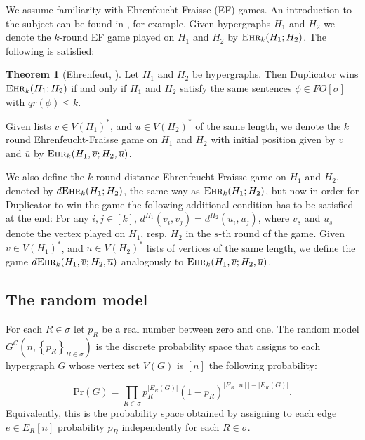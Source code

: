 \documentclass[12pt,notitlepage,a4paper]{article}
\theoremstyle{definition}
\newtheorem{theorem}{Theorem}[section]
\newcommand{\ehr}{\textsc{Ehr}}
\newcommand{\InR}[1]{\left\{ #1_R \right\}_{R\in \sigma}}
\begin{document}
We assume familiarity with Ehrenfeucht-Fraisse (EF) games.
An introduction to the subject can be found in
\cite[Section 2]{finitemodeltheory1}, for example. Given
hypergraphs $H_1$ and $H_2$ we denote the $k$-round EF game played 
on $H_1$ and
$H_2$ by $\ehr_k(H_1;H_2)$.
The following is satisfied:

\begin{theorem}
	[Ehrenfeut, \citealp{ehrenfeucht1961application}] Let
	$H_1$ and $H_2$ be hypergraphs.
	Then Duplicator wins $\ehr_k(H_1;H_2)$
	if and only if $H_1$ and $H_2$ satisfy the same 
	sentences $\phi\in FO[\sigma]$ with $qr(\phi)\leq k$.		
\end{theorem}

Given lists $\overline{v}\in V(H_1)^*$, and 
$\overline{u}\in V(H_2)^*$ of the same length, 
we denote the $k$ round 
Ehrenfeucht-Fraisse game on $H_1$ and $H_2$ with initial position given
by $\overline{v}$ and $\overline{u}$ by $\ehr_k(H_1,\overline{v};H_2,\overline{u})$.\par

We also define the $k$-round distance Ehrenfeucht-Fraisse game on 
$H_1$ and $H_2$, denoted by $d\ehr_k(H_1;H_2)$, the same way as
$\ehr_k(H_1;H_2)$, but now in order for Duplicator to win the
game the following additional condition has to be satisfied 
at the end: For any $i,j\in [k]$, $d^{H_1}(v_i,v_j)=d^{H_2}(u_i,u_j)$,
where $v_s$ and $u_s$ denote the vertex played on $H_1$, resp. $H_2$ in the 
$s$-th round of the game. 
Given $\overline{v}\in V(H_1)^*$, and $\overline{u}\in V(H_2)^*$
lists of vertices of the same length,
we define the game 
$d\ehr_k(H_1,\overline{v};H_2,\overline{u})$ analogously to 
$\ehr_k(H_1,\overline{v};H_2,\overline{u})$.


\subsection{The random model} \label{sect:random}

For each $R\in \sigma$ let
$p_R$ be a real number between zero and one.
The random model $G^{\mathcal{C}}\left(n,\InR{p}\right)$ 
is the discrete probability space that
assigns to each hypergraph $G$ whose vertex
set $V(G)$ is $[n]$ the following probability:

\[ \mathrm{Pr}(G)=\prod_{R\in \sigma} p_R^{|E_R(G)|}
(1-p_R)^{ \big|E_R[n]\big|-\big|E_R(G)\big|}.	
\]
Equivalently, this is the probability space obtained by 
assigning to each edge $e\in E_R[n]$ probability 
$p_R$ independently for each $R\in \sigma$. \par
\end{document}
